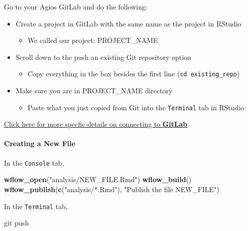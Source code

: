 \documentclass[openany]{article}
\newenvironment{Shaded}{\begin{snugshade}}{\end{snugshade}}
\newcommand{\KeywordTok}[1]{\textcolor[rgb]{0.13,0.29,0.53}{\textbf{#1}}}
\newcommand{\NormalTok}[1]{#1}
\newcommand{\StringTok}[1]{\textcolor[rgb]{0.31,0.60,0.02}{#1}}
\providecommand{\tightlist}{%
  \setlength{\itemsep}{0pt}\setlength{\parskip}{0pt}}
\let\oldparagraph\paragraph
\renewcommand{\paragraph}[1]{\oldparagraph{#1}\mbox{}}
\begin{document}
Go to your Agios GitLab and do the following:

\begin{itemize}
\tightlist
\item
  Create a project in GitLab with the same name as the project in RStudio

  \begin{itemize}
  \tightlist
  \item
    We called our project: PROJECT\_NAME
  \end{itemize}
\item
  Scroll down to the push an existing Git repository option

  \begin{itemize}
  \tightlist
  \item
    Copy everything in the box besides the first line (\texttt{cd\ existing\_repo})
  \end{itemize}
\item
  Make sure you are in PROJECT\_NAME directory

  \begin{itemize}
  \tightlist
  \item
    Paste what you just copied from Git into the \texttt{Terminal} tab in RStudio
  \end{itemize}
\end{itemize}

\protect\hyperlink{connecting-to-gitlab-1}{Click here for more specfic details on connecting to \textbf{GitLab}}

\hypertarget{creating-a-new-file}{%
\paragraph{Creating a New File}\label{creating-a-new-file}}

In the \texttt{Console} tab,

\begin{Shaded}
\begin{Highlighting}[]
\KeywordTok{wflow_open}\NormalTok{(}\StringTok{"analysis/NEW_FILE.Rmd"}\NormalTok{)}
\KeywordTok{wflow_build}\NormalTok{()}
\KeywordTok{wflow_publish}\NormalTok{(}\KeywordTok{c}\NormalTok{(}\StringTok{"analysis/*.Rmd"}\NormalTok{), }\StringTok{"Publish the file NEW_FILE"}\NormalTok{)}
\end{Highlighting}
\end{Shaded}

In the \texttt{Terminal} tab,

\begin{Shaded}
\begin{Highlighting}[]
\NormalTok{git push}
\end{Highlighting}
\end{Shaded}
\end{document}
